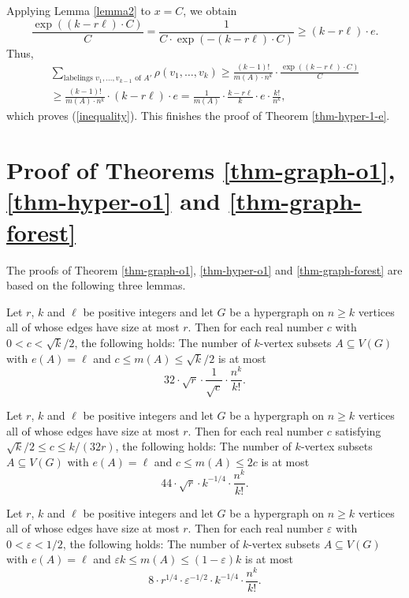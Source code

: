 Applying Lemma \ref{lemma2} to $x=C$, we obtain
\[\frac{\exp((k-r\ell)\cdot C)}{C}=\frac{1}{C\cdot \exp(-(k-r\ell)\cdot C)}\geq (k-r\ell)\cdot e.\]
Thus,
\begin{multline*}
\sum_{\text{labelings }v_1,\dots, v_{k-1}\text{ of } A'}\rho(v_1,\dots,v_k)\geq \frac{(k-1)!}{m(A)\cdot n^k}\cdot \frac{\exp\left((k-r\ell)\cdot C\right)}{C}\\
\geq \frac{(k-1)!}{m(A)\cdot n^k}\cdot (k-r\ell)\cdot e=\frac{1}{m(A)} \cdot \frac{k-r\ell}{k}\cdot e\cdot \frac{k!}{n^k},
\end{multline*}
which proves (\ref{inequality}). This finishes the proof of Theorem \ref{thm-hyper-1-e}.

\section{Proof of Theorems \ref{thm-graph-o1}, \ref{thm-hyper-o1} and \ref{thm-graph-forest}}\label{sect-proof-o1}

The proofs of Theorem \ref{thm-graph-o1}, \ref{thm-hyper-o1} and \ref{thm-graph-forest} are based on the following three lemmas.

\begin{lemma}\label{propo-1}Let $r$, $k$ and $\ell$ be positive integers and let $G$ be a hypergraph on $n \geq k$ vertices all of whose edges have size at most $r$. Then for each real number $c$ with $0<c<\sqrt{k}/2$, the following holds: The number of $k$-vertex subsets $A\subseteq V(G)$ with $e(A)=\ell$ and $c\leq m(A)\leq \sqrt{k}/2$ is at most
\[32\cdot \sqrt{r}\cdot \frac{1}{\sqrt{c}}\cdot \frac{n^k}{k!}.\]
\end{lemma}

\begin{lemma}\label{propo-2}Let $r$, $k$ and $\ell$ be positive integers  and let $G$ be a hypergraph on $n \geq k$ vertices all of whose edges have size at most $r$. Then for each real number $c$ satisfying $\sqrt{k}/2\leq c\leq k/(32r)$, the following holds: The number of $k$-vertex subsets $A\subseteq V(G)$ with $e(A)=\ell$ and $c\leq m(A)\leq 2c$ is at most
\[44\cdot \sqrt{r}\cdot k^{-1/4}\cdot \frac{n^k}{k!}.\]
\end{lemma}

\begin{lemma}\label{propo-3}Let $r$, $k$ and $\ell$ be positive integers and let $G$ be a hypergraph on $n \geq k$ vertices all of whose edges have size at most $r$. Then for each real number $\varepsilon$ with $0<\varepsilon<1/2$, the following holds: The number of $k$-vertex subsets $A\subseteq V(G)$ with $e(A)=\ell$ and $\varepsilon k \leq m(A)\leq (1-\varepsilon) k$ is at most
\[8\cdot r^{1/4}\cdot \varepsilon^{-1/2}\cdot k^{-1/4}\cdot \frac{n^k}{k!}.\]
\end{lemma}

